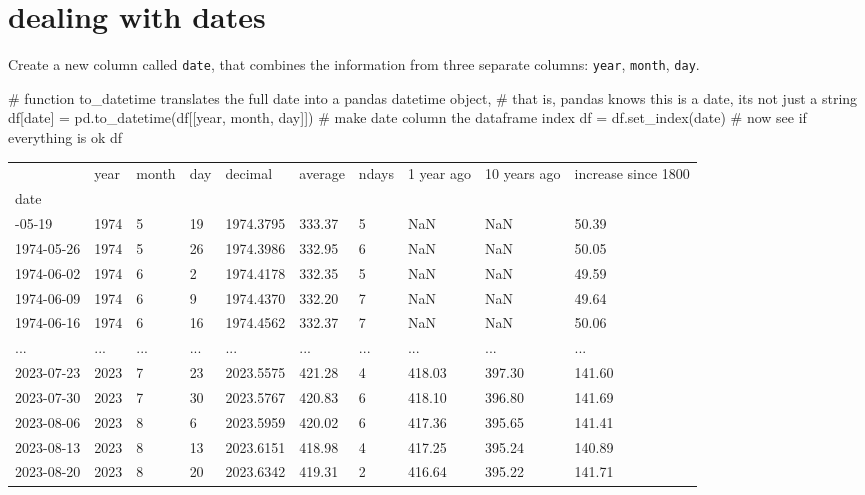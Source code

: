 \documentclass[
  letterpaper,
  DIV=11,
  numbers=noendperiod,
  oneside]{scrreprt}
\newenvironment{Shaded}{\begin{snugshade}}{\end{snugshade}}
\newcommand{\CommentTok}[1]{\textcolor[rgb]{0.37,0.37,0.37}{#1}}
\newcommand{\NormalTok}[1]{\textcolor[rgb]{0.00,0.23,0.31}{#1}}
\newcommand{\OperatorTok}[1]{\textcolor[rgb]{0.37,0.37,0.37}{#1}}
\newcommand{\StringTok}[1]{\textcolor[rgb]{0.13,0.47,0.30}{#1}}
\begin{document}
\hypertarget{dealing-with-dates}{%
\section{dealing with dates}\label{dealing-with-dates}}

Create a new column called \texttt{date}, that combines the information
from three separate columns: \texttt{year}, \texttt{month},
\texttt{day}.

\begin{Shaded}
\begin{Highlighting}[]
\CommentTok{\# function to\_datetime translates the full date into a pandas datetime object,}
\CommentTok{\# that is, pandas knows this is a date, it\textquotesingle{}s not just a string}
\NormalTok{df[}\StringTok{\textquotesingle{}date\textquotesingle{}}\NormalTok{] }\OperatorTok{=}\NormalTok{ pd.to\_datetime(df[[}\StringTok{\textquotesingle{}year\textquotesingle{}}\NormalTok{, }\StringTok{\textquotesingle{}month\textquotesingle{}}\NormalTok{, }\StringTok{\textquotesingle{}day\textquotesingle{}}\NormalTok{]])}
\CommentTok{\# make \textquotesingle{}date\textquotesingle{} column the dataframe index}
\NormalTok{df }\OperatorTok{=}\NormalTok{ df.set\_index(}\StringTok{\textquotesingle{}date\textquotesingle{}}\NormalTok{)}
\CommentTok{\# now see if everything is ok}
\NormalTok{df}
\end{Highlighting}
\end{Shaded}

\begin{longtable}[]{@{}llllllllll@{}}
\toprule\noalign{}
& year & month & day & decimal & average & ndays & 1 year ago & 10 years
ago & increase since 1800 \\
date & & & & & & & & & \\
\midrule\noalign{}
\endhead
\bottomrule\noalign{}
\endlastfoot
1974-05-19 & 1974 & 5 & 19 & 1974.3795 & 333.37 & 5 & NaN & NaN &
50.39 \\
1974-05-26 & 1974 & 5 & 26 & 1974.3986 & 332.95 & 6 & NaN & NaN &
50.05 \\
1974-06-02 & 1974 & 6 & 2 & 1974.4178 & 332.35 & 5 & NaN & NaN &
49.59 \\
1974-06-09 & 1974 & 6 & 9 & 1974.4370 & 332.20 & 7 & NaN & NaN &
49.64 \\
1974-06-16 & 1974 & 6 & 16 & 1974.4562 & 332.37 & 7 & NaN & NaN &
50.06 \\
... & ... & ... & ... & ... & ... & ... & ... & ... & ... \\
2023-07-23 & 2023 & 7 & 23 & 2023.5575 & 421.28 & 4 & 418.03 & 397.30 &
141.60 \\
2023-07-30 & 2023 & 7 & 30 & 2023.5767 & 420.83 & 6 & 418.10 & 396.80 &
141.69 \\
2023-08-06 & 2023 & 8 & 6 & 2023.5959 & 420.02 & 6 & 417.36 & 395.65 &
141.41 \\
2023-08-13 & 2023 & 8 & 13 & 2023.6151 & 418.98 & 4 & 417.25 & 395.24 &
140.89 \\
2023-08-20 & 2023 & 8 & 20 & 2023.6342 & 419.31 & 2 & 416.64 & 395.22 &
141.71 \\
\end{longtable}
\end{document}
